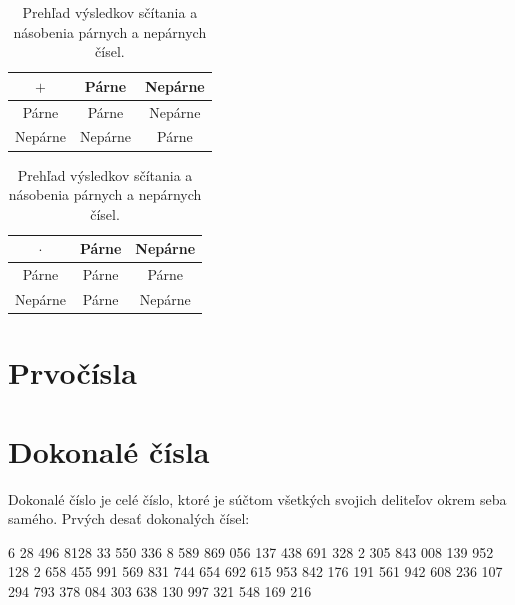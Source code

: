 \documentclass{article}
\begin{document}
\begin{table}[H]
  \centering
  \renewcommand{\arraystretch}{1.5}
  \begin{tabular}{c|cc}
    \(+\) & Párne & Nepárne\\
    \hline
    Párne & Párne & Nepárne \\
    Nepárne & Nepárne & Párne \\
  \end{tabular}
  \hspace{1em}
  \begin{tabular}{c|cc}
    \(\cdot\) & Párne & Nepárne\\
    \hline
    Párne & Párne & Párne \\
    Nepárne & Párne & Nepárne \\
  \end{tabular}
  \caption{Prehľad výsledkov sčítania a násobenia párnych a nepárnych čísel.}
\end{table}

\section{Prvočísla}

\section{Dokonalé čísla}

Dokonalé číslo je celé číslo, ktoré je súčtom všetkých svojich deliteľov okrem seba samého.
Prvých desať dokonalých čísel:

6
28
496
8128
33 550 336
8 589 869 056
137 438 691 328
2 305 843 008 139 952 128
2 658 455 991 569 831 744 654 692 615 953 842 176
191 561 942 608 236 107 294 793 378 084 303 638 130 997 321 548 169 216
\end{document}
